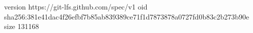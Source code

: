 version https://git-lfs.github.com/spec/v1
oid sha256:381e41dac4f26efbf7b85ab839389ce71f1d7873878a0727fd0b83c2b273b90e
size 131168
